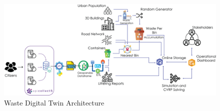 \documentclass[authoryear,preprint,review,11pt,doubleblind]{elsarticle}
\begin{document}
    
       \begin{figure}[h]
       \centering
    \includegraphics[width=1.2\textwidth]{Figures/System Architecture.png}
        \caption{Waste Digital Twin Architecture}
        \label{fig:architecture}
    \end{figure}


\end{document}

